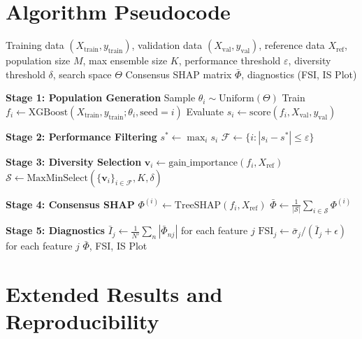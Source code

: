 \documentclass[11pt]{article}
\begin{document}
\appendix

\section{Algorithm Pseudocode}
\label{app:algorithm}

\begin{algorithm}[htbp]
\caption{DASH Pipeline}
\label{alg:dash}
\begin{algorithmic}[1]
\REQUIRE Training data $(X_{\text{train}}, y_{\text{train}})$, validation
  data $(X_{\text{val}}, y_{\text{val}})$, reference data $X_{\text{ref}}$,
  population size $M$, max ensemble size $K$, performance threshold
  $\varepsilon$, diversity threshold $\delta$, search space $\Theta$
\ENSURE Consensus SHAP matrix $\bar{\Phi}$, diagnostics (FSI, IS Plot)

\STATE \textbf{Stage 1: Population Generation}
  \STATE Sample $\theta_i \sim \text{Uniform}(\Theta)$
  \STATE Train $f_i \gets \text{XGBoost}(X_{\text{train}}, y_{\text{train}};
    \theta_i, \text{seed}=i)$
  \STATE Evaluate $s_i \gets \text{score}(f_i, X_{\text{val}}, y_{\text{val}})$
\ENDFOR

\STATE \textbf{Stage 2: Performance Filtering}
\STATE $s^* \gets \max_i s_i$
\STATE $\mathcal{F} \gets \{i : |s_i - s^*| \leq \varepsilon\}$

\STATE \textbf{Stage 3: Diversity Selection}
  \STATE $\mathbf{v}_i \gets \text{gain\_importance}(f_i, X_{\text{ref}})$
\ENDFOR
\STATE $\mathcal{S} \gets \text{MaxMinSelect}(\{\mathbf{v}_i\}_{i \in \mathcal{F}},
  K, \delta)$

\STATE \textbf{Stage 4: Consensus SHAP}
  \STATE $\Phi^{(i)} \gets \text{TreeSHAP}(f_i, X_{\text{ref}})$
\ENDFOR
\STATE $\bar{\Phi} \gets \frac{1}{|\mathcal{S}|} \sum_{i \in \mathcal{S}}
  \Phi^{(i)}$

\STATE \textbf{Stage 5: Diagnostics}
\STATE $\bar{I}_j \gets \frac{1}{N'}\sum_n |\bar{\Phi}_{nj}|$ for each
  feature $j$
\STATE $\text{FSI}_j \gets \bar{\sigma}_j / (\bar{I}_j + \epsilon)$ for
  each feature $j$
\RETURN $\bar{\Phi}$, FSI, IS Plot
\end{algorithmic}
\end{algorithm}

\section{Extended Results and Reproducibility}
\label{app:full_sweep}
\end{document}
